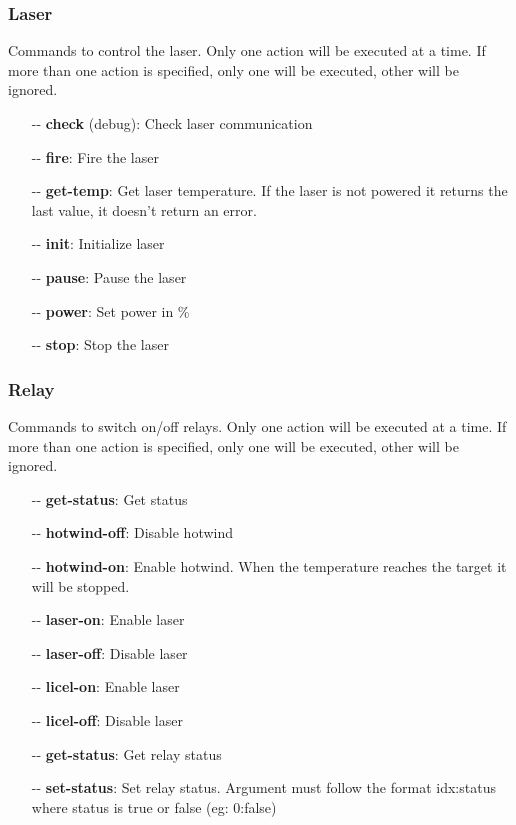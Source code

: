 \documentclass[letterpaper, 10 pt]{article}
\begin{document}
\subsubsection{Laser}
Commands to control the laser. Only one action will be executed at a time. If more than one action is specified, only one will be executed, other will be ignored.
\begin{itemize}
	\item[-{}-] \textbf{check } (debug): Check laser communication
	\item[-{}-] \textbf{fire}: Fire the laser
	\item[-{}-] \textbf{get-temp}: Get laser temperature. If the laser is not powered it returns the last value, it doesn't return an error.
	\item[-{}-] \textbf{init}: Initialize laser
	\item[-{}-] \textbf{pause}: Pause the laser
	\item[-{}-] \textbf{power}: Set power in \%
	\item[-{}-] \textbf{stop}: Stop the laser
\end{itemize}

\subsubsection{Relay}
Commands to switch on/off relays. Only one action will be executed at a time. If more than one action is specified, only one will be executed, other will be ignored.
\begin{itemize}
	\item[-{}-] \textbf{get-status}: Get status
	\item[-{}-] \textbf{hotwind-off}: Disable hotwind
	\item[-{}-] \textbf{hotwind-on}: Enable hotwind. When the temperature reaches the target it will be stopped.
	\item[-{}-] \textbf{laser-on}: Enable laser
	\item[-{}-] \textbf{laser-off}: Disable laser
	\item[-{}-] \textbf{licel-on}: Enable laser
	\item[-{}-] \textbf{licel-off}: Disable laser
	\item[-{}-] \textbf{get-status}: Get relay status
	\item[-{}-] \textbf{set-status}: Set relay status. Argument must follow the format idx:status where status is true or false (eg: 0:false)
\end{itemize}
\end{document}
